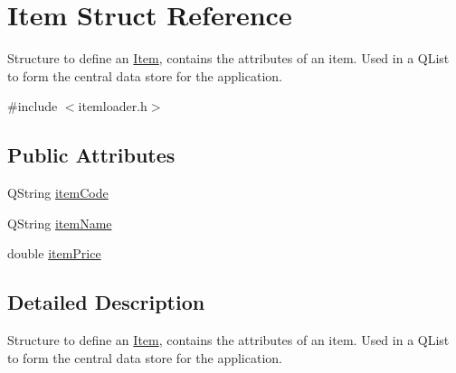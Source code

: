 \hypertarget{struct_item}{\section{Item Struct Reference}
\label{struct_item}
}


Structure to define an \hyperlink{struct_item}{Item}, contains the attributes of an item. Used in a Q\-List to form the central data store for the application.  




{\ttfamily \#include $<$itemloader.\-h$>$}

\subsection*{Public Attributes}
\begin{DoxyCompactItemize}
\item 
Q\-String \hyperlink{struct_item_a35894237e42dd9ca0d737e660d07e370}{item\-Code}
\item 
Q\-String \hyperlink{struct_item_ae145622d2df65a4a45979fd7933b30c7}{item\-Name}
\item 
double \hyperlink{struct_item_aa3f106177de7d68189cfe2b9051a54fd}{item\-Price}
\end{DoxyCompactItemize}


\subsection{Detailed Description}
Structure to define an \hyperlink{struct_item}{Item}, contains the attributes of an item. Used in a Q\-List to form the central data store for the application. 

